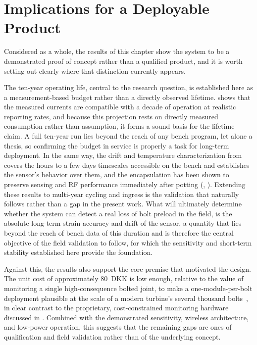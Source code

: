 \section{Implications for a Deployable Product}
Considered as a whole, the results of this chapter show the system to be a demonstrated proof of concept rather than a qualified product, and it is worth setting out clearly where that distinction currently appears.

The ten-year operating life, central to the research question, is established here as a measurement-based budget rather than a directly observed lifetime.
 shows that the measured currents are compatible with a decade of operation at realistic reporting rates, and because this projection rests on directly measured consumption rather than assumption, it forms a sound basis for the lifetime claim. 
A full ten-year run lies beyond the reach of any bench program, let alone a thesis, so confirming the budget in service is properly a task for long-term deployment. 
In the same way, the drift and temperature characterization from  covers the hours to a few days timescales accessible on the bench and establishes the sensor's behavior over them, and the encapsulation has been shown to preserve sensing and RF performance immediately after potting (, ). Extending these results to multi-year cycling and ingress is the validation that naturally follows rather than a gap in the present work. What will ultimately determine whether the system can detect a real loss of bolt preload in the field, is the absolute long-term strain accuracy and drift of the sensor, a quantity that lies beyond the reach of bench data of this duration and is therefore the central objective of the field validation to follow, for which the sensitivity and short-term stability established here provide the foundation.

Against this, the results also support the core premise that motivated the design. The unit cost of approximately \SI{80}{DKK} is low enough, relative to the value of monitoring a single high-consequence bolted joint, to make a one-module-per-bolt deployment plausible at the scale of a modern turbine's several thousand bolts~\cite{6000bolts}, in clear contrast to the proprietary, cost-constrained monitoring hardware discussed in . Combined with the demonstrated sensitivity, wireless architecture, and low-power operation, this suggests that the remaining gaps are ones of qualification and field validation rather than of the underlying concept.